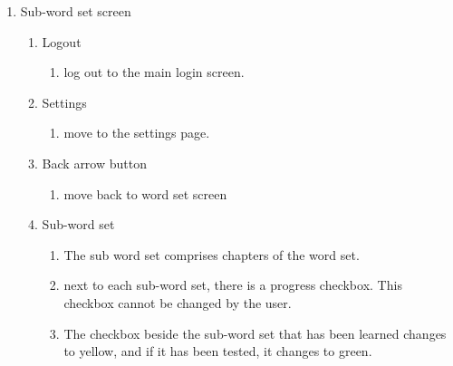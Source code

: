 \documentclass[conference]{IEEEtran}
\begin{document}
\begin{enumerate}
\begin{enumerate}
        \end{enumerate}
        \item Sub-word set screen
            \begin{enumerate}
                \item Logout
                \begin{enumerate}
                    \item log out to the main login screen.
                \end{enumerate}
                \item Settings
                \begin{enumerate}
                    \item move to the settings page.
                \end{enumerate}
                \item Back arrow button
                \begin{enumerate}
                    \item move back to word set screen
                \end{enumerate}
                \item Sub-word set
                \begin{enumerate}
                    \item The sub word set comprises chapters of the word set.
                    \item next to each sub-word set, there is a progress checkbox. This checkbox cannot be changed by the user.
                    \item The checkbox beside the sub-word set that has been learned changes to yellow, and if it has been tested, it changes to green.
                \end{enumerate}

\end{enumerate}
\end{enumerate}
\end{document}
